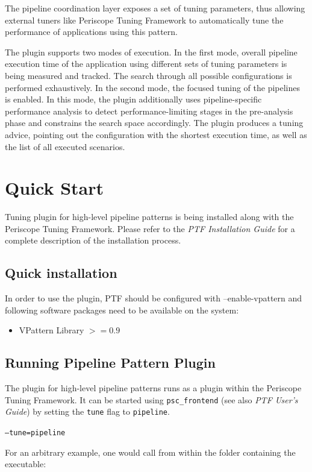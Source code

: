 \documentclass[11pt,a4paper, oneside]{book} %
\begin{document}
The pipeline coordination layer exposes a set of tuning parameters, thus allowing external tuners like
Periscope Tuning Framework to automatically tune the performance of applications using this pattern.

The plugin supports two modes of execution. In the first mode, overall pipeline execution time
of the application using different sets of tuning parameters is being measured and tracked. The search
through all possible configurations is performed exhaustively. In the second mode, the focused
tuning of the pipelines is enabled. In this mode, the plugin additionally uses pipeline-specific performance
analysis to detect performance-limiting stages in the pre-analysis phase and constrains the search space accordingly.
The plugin produces a tuning advice, pointing out the configuration with the shortest execution time, as well as the list
of all executed scenarios.

\chapter{Quick Start}
Tuning plugin for high-level pipeline patterns is being installed along with the Periscope Tuning Framework. Please refer to the \textit{PTF Installation Guide} for a complete description of the installation process.

\section{Quick installation}
In order to use the plugin, PTF should be configured with --enable-vpattern and following software packages need to be available on the system:
  \begin{itemize}
    \item VPattern Library $>=0.9$
  \end{itemize}

\section{Running Pipeline Pattern Plugin}
The plugin for high-level pipeline patterns runs as a plugin within the Periscope Tuning Framework. It can be started using \texttt{psc\_frontend} (see also \textit{PTF User's Guide}) by setting the \texttt{tune} flag to \texttt{pipeline}.
\begin{center}
\texttt{--tune=pipeline}
\end{center}

For an arbitrary example, one would call from within the folder containing the executable:
\vspace*{0.5cm}
\end{document}
